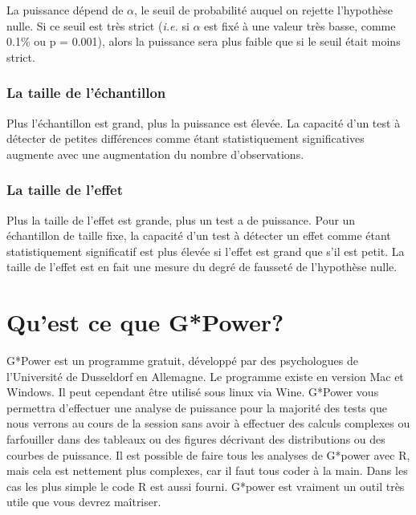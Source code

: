 \documentclass[12pt,]{book}
\begin{document}
La puissance dépend de \(\alpha\), le seuil de probabilité auquel on rejette l'hypothèse nulle.
Si ce seuil est très strict (\emph{i.e.} si \(\alpha\) est fixé à une valeur très basse, comme 0.1\% ou p = 0.001), alors la puissance sera plus faible que si le seuil était moins strict.

\hypertarget{la-taille-de-luxe9chantillon}{%
\subsubsection*{La taille de l'échantillon}\label{la-taille-de-luxe9chantillon}}


Plus l'échantillon est grand, plus la puissance est élevée.
La capacité d'un test à détecter de petites différences comme étant statistiquement significatives augmente avec une augmentation du nombre d'observations.

\hypertarget{la-taille-de-leffet}{%
\subsubsection*{La taille de l'effet}\label{la-taille-de-leffet}}


Plus la taille de l'effet est grande, plus un test a de puissance.
Pour un échantillon de taille fixe, la capacité d'un test à détecter un effet comme étant statistiquement significatif est plus élevée si l'effet est grand que s'il est petit.
La taille de l'effet est en fait une mesure du degré de fausseté de l'hypothèse nulle.

\hypertarget{quest-ce-que-gpower}{%
\section{Qu'est ce que G*Power?}\label{quest-ce-que-gpower}}

G*Power est un programme gratuit, développé par des psychologues de l'Université de Dusseldorf en Allemagne.
Le programme existe en version Mac et Windows.
Il peut cependant être utilisé sous linux via Wine.
G*Power vous permettra d'effectuer une analyse de puissance pour la majorité des tests que nous verrons au cours de la session sans avoir à effectuer des calculs complexes ou farfouiller dans des tableaux ou des figures décrivant des distributions ou des courbes de puissance.
Il est possible de faire tous les analyses de G*power avec R, mais cela est nettement plus complexes, car il faut tous coder à la main. Dans les cas les plus simple le code R est aussi fourni.
G*power est vraiment un outil très utile que vous devrez maîtriser.
\end{document}
